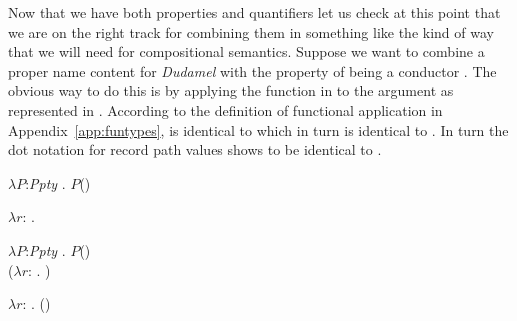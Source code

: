 Now that we have both properties and quantifiers let us check at this
point that we are on the right track for combining them in something
like the kind of way that we will need for compositional semantics.
Suppose we want to combine a proper name content for \textit{Dudamel}
 with the property of being a conductor .  The
obvious way to do this is by applying the function in  to
the argument  as represented in .  According to
the definition of functional application in
Appendix~\ref{app:funtypes},  is identical to 
which in turn is identical to .  In turn the dot notation
for record path values shows
 to be identical to .
\begin{ex} 
\begin{subex} 
 
\item $\lambda P$:\textit{Ppty} . $P$() 
 
\item $\lambda
r$:
.  

\item $\lambda P$:\textit{Ppty} . $P$() \\
\hspace*{1em}($\lambda
r$:
. )

\item $\lambda
r$:
. ()

\item {}

\item {}
 
\end{subex} 
\label{ex:diac}  
\end{ex} 
      

